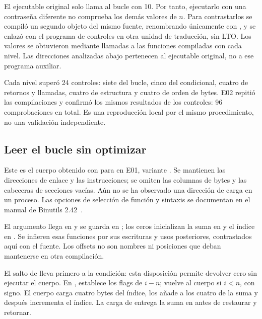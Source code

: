 El ejecutable original solo llama al bucle con 10. Por tanto, ejecutarlo con una
contraseña diferente no comprueba los demás valores de $n$. Para contrastarlos se
compiló un segundo objeto del mismo fuente, renombrando únicamente 
con , y se enlazó con el programa de controles en otra
unidad de traducción, sin LTO. Los valores se obtuvieron mediante llamadas a las
funciones compiladas con cada nivel. Las direcciones analizadas abajo pertenecen
al ejecutable original, no a ese programa auxiliar.

Cada nivel superó 24 controles: siete del bucle, cinco del condicional, cuatro de
retornos y llamadas, cuatro de estructura y cuatro de orden de bytes. E02 repitió
las compilaciones y confirmó los mismos resultados de los controles: 96 comprobaciones en total.
Es una reproducción local por el mismo procedimiento, no una validación independiente.

\subsection{Leer el bucle sin optimizar}

Este es el cuerpo obtenido con  para
 en E01, variante . Se mantienen las direcciones
de enlace y las instrucciones; se omiten las columnas de bytes y las cabeceras
de secciones vacías. Aún no se ha observado una dirección de carga en un proceso.
Las opciones de selección de función y sintaxis se documentan en el manual
de Binutils 2.42~\parencite[apartado \emph{objdump}]{binutils242objdump}.

\begin{bloquecodigo}

\end{bloquecodigo}

El argumento  llega en  y se guarda en
\codigo{[rbp-0x14]}; los ceros inicializan la suma en \codigo{[rbp-0x8]} y el
índice en \codigo{[rbp-0x4]}. Se infieren esas funciones por sus escrituras y
usos posteriores, contrastados aquí con el fuente. Los offsets no son nombres ni
posiciones que deban mantenerse en otra compilación.

El salto de  lleva primero a la condición: esta disposición
permite devolver cero sin ejecutar el cuerpo. En , 
establece los flags de $i-n$;  vuelve al cuerpo si $i<n$, con signo.
El cuerpo carga cuatro bytes del índice, los añade a los cuatro de la suma y
después incrementa el índice. La carga de  entrega la suma en
 antes de restaurar  y retornar.

